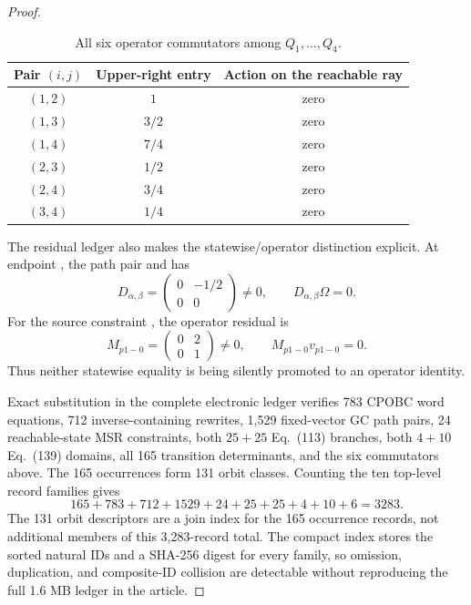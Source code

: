 \documentclass[11pt]{article}
\theoremstyle{definition}
\theoremstyle{remark}
\begin{document}
\begin{proof}
\begin{table}[ht]
\centering
\caption{All six operator commutators among \(Q_1,\ldots,Q_4\).}
\label{tab:c2-commutators}
\begin{tabular}{c c c}
\toprule
Pair \((i,j)\) & Upper-right entry & Action on the reachable ray\\
\midrule
\((1,2)\) & \(1\)   & zero\\
\((1,3)\) & \(3/2\) & zero\\
\((1,4)\) & \(7/4\) & zero\\
\((2,3)\) & \(1/2\) & zero\\
\((2,4)\) & \(3/4\) & zero\\
\((3,4)\) & \(1/4\) & zero\\
\bottomrule
\end{tabular}
\end{table}

The residual ledger also makes the statewise/operator distinction explicit.
At endpoint , the path pair
 and
 has
\[
 D_{\alpha,\beta}=
 \begin{pmatrix}0&-1/2\\0&0\end{pmatrix}\neq0,
 \qquad D_{\alpha,\beta}\Omega=0.
\]
For the source constraint , the operator residual is
\[
 M_{p1-0}=\begin{pmatrix}0&2\\0&1\end{pmatrix}\neq0,
 \qquad M_{p1-0}v_{p1-0}=0.
\]
Thus neither statewise equality is being silently promoted to an operator
identity.

Exact substitution in the complete electronic ledger verifies 783 CPOBC
word equations, 712 inverse-containing rewrites, 1,529 fixed-vector GC path
pairs, 24 reachable-state MSR constraints, both \(25+25\) Eq.~(113)
branches, both \(4+10\) Eq.~(139) domains, all 165 transition determinants,
and the six commutators above.  The 165 occurrences form 131 orbit classes.
Counting the ten top-level record families gives
\[
  165+783+712+1529+24+25+25+4+10+6=3283.
\]
The 131 orbit descriptors are a join index for the 165 occurrence records,
not additional members of this 3,283-record total.  The compact index stores
the sorted natural IDs and a SHA-256 digest for every family, so omission,
duplication, and composite-ID collision are detectable without reproducing
the full 1.6 MB ledger in the article.


\end{proof}
\end{document}
